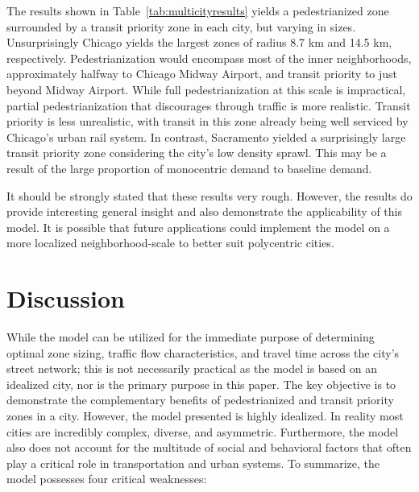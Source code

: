 \documentclass{elsarticle}\usepackage[]{graphicx}\usepackage[]{color}
\begin{document}
The results shown in Table~\ref{tab:multicityresults} yields a pedestrianized zone surrounded by a transit priority zone in each city, but varying in sizes. Unsurprisingly Chicago yields the largest zones of radius 8.7 km and 14.5 km, respectively. Pedestrianization would encompass most of the inner neighborhoods, approximately halfway to Chicago Midway Airport, and transit priority to just beyond Midway Airport. While full pedestrianization at this scale is impractical, partial pedestrianization that discourages through traffic is more realistic. Transit priority is less unrealistic, with transit in this zone already being well serviced by Chicago's urban rail system. In contrast, Sacramento yielded a surprisingly large transit priority zone considering the city's low density sprawl. This may be a result of the large proportion of monocentric demand to baseline demand.

It should be strongly stated that these results very rough. However, the results do provide interesting general insight and also demonstrate the applicability of this model. It is possible that future applications could implement the model on a more localized neighborhood-scale to better suit polycentric cities. 


\section{Discussion}
While the model can be utilized for the immediate purpose of determining optimal zone sizing, traffic flow characteristics, and travel time across the city's street network; this is not necessarily practical as the model is based on an idealized city, nor is the primary purpose in this paper. The key objective is to demonstrate the complementary benefits of pedestrianized and transit priority zones in a city. However, the model presented is highly idealized. In reality most cities are incredibly complex, diverse, and asymmetric. Furthermore, the model also does not account for the multitude of social and behavioral factors that often play a critical role in transportation and urban systems. To summarize, the model possesses four critical weaknesses:
\end{document}
